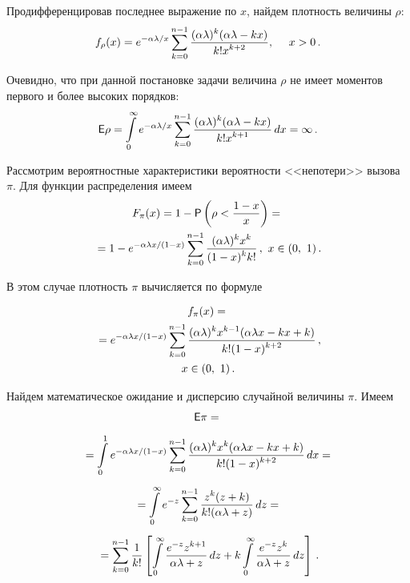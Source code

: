 \begin{multicols}{2}
Продифференцировав последнее выражение по $x$, найдем плотность величины $\rho$:
$$
f_\rho(x)=
e^{-\alpha\lambda/x}\sum_{k=0}^{n-1}\displaystyle\frac{\displaystyle (\alpha\lambda)^k(\alpha\lambda-kx)\mathstrut}{\displaystyle k!x^{k+2}\mathstrut},\ \ \ \ x>0\,.
$$

Очевидно, что при данной постановке задачи величина $\rho$ не имеет моментов первого и более высоких порядков:
$$
{\sf E}\rho=\int\limits_{0}^{\infty}e^{-\alpha\lambda/x}
\sum_{k=0}^{n-1}\displaystyle\frac{\displaystyle (\alpha\lambda)^k(\alpha\lambda-kx)\mathstrut}{\displaystyle k!x^{k+1}\mathstrut}\,dx=\infty\,.
$$

Рассмотрим вероятностные характеристики вероятности <<непотери>> вызова $\pi$. Для функции распределения имеем
\begin{multline*}
F_\pi(x)=1-{\sf P}\left(\rho<\displaystyle\frac{\displaystyle 1-x\mathstrut}{\displaystyle x\mathstrut}\right)={}\\
{}= 1-e^{-\alpha\lambda x/ (1-x)}\sum_{k=0}^{n-1}\displaystyle\frac{\displaystyle (\alpha\lambda)^k x^k\mathstrut}{\displaystyle (1-x)^k k!\mathstrut}\,,
\ x\in(0,\ 1)\,.
\end{multline*}

В этом случае плотность $\pi$ вычисляется по формуле

\noindent
{\begin{multline*}
f_\pi(x)={}\\
{}=e^{-\alpha\lambda x / (1-x)}
\sum_{k=0}^{n-1}\displaystyle\frac{\displaystyle (\alpha\lambda)^k x^{k-1}(\alpha\lambda x-k
x+k)\mathstrut}{\displaystyle k!(1-x)^{k+2}\mathstrut}\,,\\
x\in(0,\ 1)\,.
\end{multline*}
}


Найдем математическое ожидание и дисперсию случайной величины $\pi$. Имеем
\begin{multline*}
{\sf E}\pi={}\\[5pt]
{}=\int\limits_{0}^{1}e^{-\alpha\lambda x /(1-x)} \sum_{k=0}^{n-1}\displaystyle\frac{\displaystyle (\alpha\lambda)^k x^k(\alpha\lambda x -k x
+k)\mathstrut}{\displaystyle k! (1-x)^{k+2}\mathstrut}\,dx={}\\[5pt]
{}=\int\limits_{0}^{\infty}e^{-z} \sum_{k=0}^{n-1}\displaystyle\frac{\displaystyle z^k(z+k)\mathstrut}{\displaystyle k!(\alpha\lambda+z)\mathstrut}\, dz={}\\[5pt]
{}=\sum_{k=0}^{n-1}\displaystyle\frac{\displaystyle 1\mathstrut}{\displaystyle k!\mathstrut}\left[\int\limits_{0}^{\infty}\displaystyle\frac{\displaystyle e^{-z}z^{k+1}\mathstrut}{\displaystyle \alpha\lambda+z\mathstrut}\,
dz+k\int\limits_{0}^{\infty}\displaystyle\frac{\displaystyle e^{-z}z^k\mathstrut}{\displaystyle \alpha\lambda+z\mathstrut}\, dz\right]\,.
\end{multline*}


\end{multicols}
